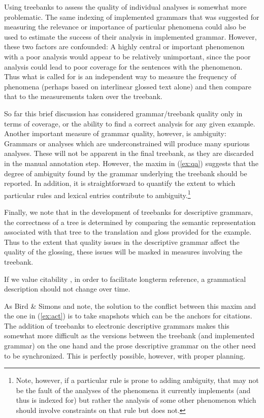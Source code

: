 Using treebanks to assess the quality of individual analyses
is somewhat more problematic.  The same indexing of implemented grammars
that was suggested for measuring the relevance or importance of
particular phenomena could also be used to estimate the success
of their analysis in implemented grammar.  However, these two
factors are confounded:  A highly central or important phenomenon with
a poor analysis would appear to be relatively unimportant, since the
poor analysis could lead to poor coverage for the sentences with
the phenomenon.  Thus what is called for is an independent way to
measure the frequency of phenomena (perhaps based on interlinear
glossed text alone) and then compare that to the measurements taken
over the treebank.

So far this brief discussion has considered grammar/treebank
quality only in terms of coverage, or the ability to find a correct
analysis for any given example.  Another important measure of grammar
quality, however, is ambiguity: Grammars or analyses which are
underconstrained will produce many spurious analyses.  These will not
be apparent in the final treebank, as they are discarded in the manual
annotation step.  However, the maxim in (\ref{ex:qa}) suggests that the
degree of ambiguity found by the grammar underlying the treebank
should be reported.  In addition, it is straightforward to quantify the
extent to which particular rules and lexical entries contribute to
ambiguity.\footnote{Note, however, if a particular rule is prone
to adding ambiguity, that may not be the fault of the analyses of
the phenomena it currently implements (and thus is indexed for) but
rather the analysis of some other phenomenon which should involve
constraints on that rule but does not.}

Finally, we note that in the development of treebanks for descriptive
grammars, the correctness of a tree is determined by comparing the
semantic representation associated with that tree to the translation
and gloss provided for the example.  Thus to the extent that quality
issues in the descriptive grammar affect the quality of the glossing,
these issues will be masked in measures involving the treebank.

\begin{exe}
 If we value citability \cite[14]{Bir:Sim:03},
in order to facilitate longterm reference, a grammatical description
should not change over time.
\end{exe}

As \nocite{Bir:Sim:03} Bird \& Simons and \citeauthor{Nordhoff:08} note,
the solution to the conflict between this maxim and the one
in (\ref{ex:act}) is to take snapshots which can be the anchors
for citations.  The addition of treebanks to electronic descriptive
grammars makes this somewhat more difficult as the versions between
the treebank (and implemented grammar) on the one hand and the
prose descriptive grammar on the other need to be synchronized.
This is perfectly possible, however, with proper planning.

